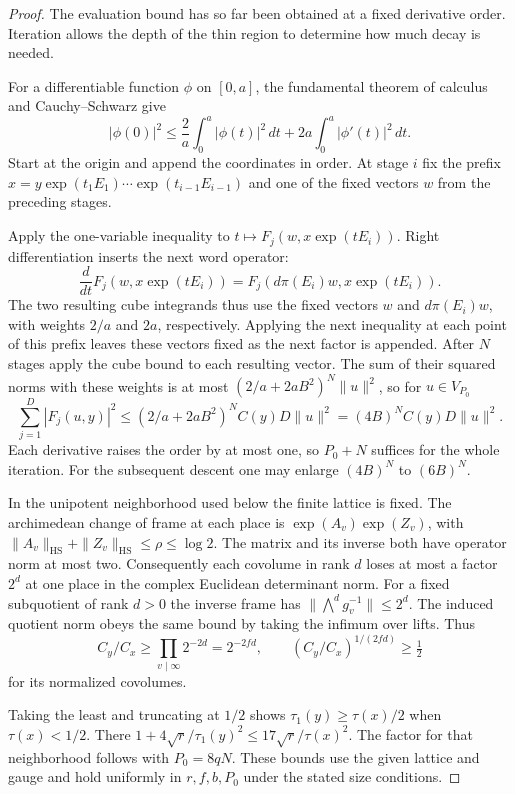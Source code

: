 \begin{proof}

The evaluation bound has so far been obtained at a fixed derivative order. Iteration allows the depth of the thin region to determine how much decay is needed.


For a differentiable function \(\phi\) on \([0,a]\), the fundamental
theorem of calculus and Cauchy--Schwarz give
\[
 |\phi(0)|^2\le\frac{2}{a}\int_0^a|\phi(t)|^2\,dt
                     +2a\int_0^a|\phi'(t)|^2\,dt .
\]
Start at the origin and append the coordinates in order. At stage
\(i\) fix the prefix \(x=y\exp(t_1 E_1)\cdots
\exp(t_{i-1}E_{i-1})\) and one of the fixed vectors \(w\) from
the preceding stages.

Apply the one-variable inequality to
\(t\mapsto F_j(w,x\exp(tE_i))\). Right differentiation inserts the next word operator:
\[
 \frac d{dt}F_j(w,x\exp(tE_i))=F_j(d\pi(E_i)w,x\exp(tE_i)).
\] The two resulting
cube integrands thus use the fixed vectors \(w\) and
\(d\pi(E_i)w\), with weights \(2/a\) and \(2a\),
respectively. Applying the next inequality at each point of this
prefix leaves these vectors fixed as the next factor is appended.
After \(N\) stages apply the cube bound to each resulting vector.
The sum of their squared norms with these weights is at most
\((2/a+2aB^2)^N\|u\|^2\), so for \(u\in V_{P_0}\)
\[
 \sum_{j=1}^D |F_j(u,y)|^2\le(2/a+2a B^2)^N C(y)D\|u\|^2
                          =(4B)^N C(y)D\|u\|^2 .
\]
Each derivative raises the order by at most one, so \(P_0+N\)
suffices for the whole iteration. For the subsequent descent one may enlarge \((4B)^N\) to \((6B)^N\).

In the unipotent neighborhood used below the finite lattice is
fixed. The archimedean change of frame at each place is
\(\exp(A_v)\exp(Z_v)\), with
\(\|A_v\|_{\mathrm{HS}}+\|Z_v\|_{\mathrm{HS}}\le\rho\le\log 2\).
The matrix and its inverse both have operator norm at most two.
Consequently each covolume in rank \(d\) loses at most a factor
\(2^d\) at one place in the complex Euclidean determinant norm.
For a fixed subquotient of rank \(d>0\) the inverse frame has
\(\|\bigwedge^d g_v^{-1}\|\le2^d\). The induced quotient norm obeys
the same bound by taking the infimum over lifts. Thus
\[
  C_y/C_x\ge\prod_{v\mid\infty}2^{-2d}=2^{-2fd},\qquad
  (C_y/C_x)^{1/(2fd)}\ge\tfrac12
\]
for its normalized covolumes.

Taking the least and truncating at \(1/2\) shows
\(\tau_1(y)\ge\tau(x)/2\) when \(\tau(x)<1/2\). There
\(1+4\sqrt r/\tau_1(y)^2\le17\sqrt r/\tau(x)^2\). The factor for
that neighborhood follows with \(P_0=8qN\). These bounds use the
given lattice and gauge and hold uniformly in \(r,f,b,P_0\) under
the stated size conditions.
\end{proof}
